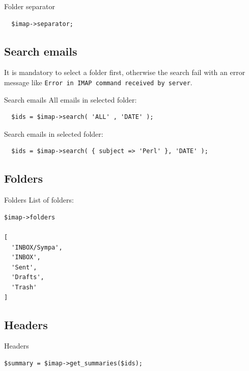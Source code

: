 \begin{frame}[fragile]{Folder separator}

\begin{verbatim}
  $imap->separator;
\end{verbatim}

\end{frame}

\subsection{Search emails}

It is mandatory to select a folder first, otherwise the search fail with an
error message like \verb|Error in IMAP command received by server|.

\begin{frame}[fragile]{Search emails}
  All emails in selected folder:

\begin{verbatim}
  $ids = $imap->search( 'ALL' , 'DATE' );
\end{verbatim}

  Search emails in selected folder:

\begin{verbatim}
  $ids = $imap->search( { subject => 'Perl' }, 'DATE' );
\end{verbatim}
\end{frame}

\subsection{Folders}

\begin{frame}[fragile]{Folders}
  List of folders:

\begin{verbatim}
$imap->folders

[
  'INBOX/Sympa',
  'INBOX',
  'Sent',
  'Drafts',
  'Trash'
]
\end{verbatim}
\end{frame}

\subsection{Headers}

\begin{frame}[fragile]{Headers}
\begin{verbatim}
$summary = $imap->get_summaries($ids);
\end{verbatim}
\end{frame}

